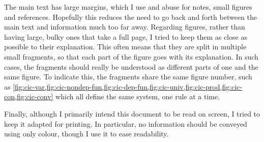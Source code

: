 The main text has large margins, which I use and abuse 
for notes, small figures and references. Hopefully this reduces the need to go
back and forth between the main text and information much too far away.
Regarding figures, rather than having large, bulky ones that take a full page,
I tried to keep them as close as possible to their explanation. This often means that
they are split in multiple small fragments, so that each part of the figure goes with its
explanation. In such cases, the fragments should really be understood
as different parts of one and the same figure. To indicate this, the fragments share the same
figure number, such as
\cref{fig:cic-var,fig:cic-nondep-fun,fig:cic-dep-fun,fig:cic-univ,fig:cic-prod,fig:cic-con,fig:cic-conv} which all define the same system, one rule at a time.

Finally, although I primarily intend this document to be read on screen, I tried to
keep it adapted for printing. In particular,
no information should be conveyed using only colour, though I use it to ease readability.

\cleardoubleevenemptypage


\begingroup %

\hypersetup{allcolors=.}

\setlength{\textheight}{230\vscale} %

\etocstandarddisplaystyle %
\etocstandardlines %
\setcounter{tocdepth}{\sectiontocdepth} %

\tableofcontents %

\setcounter{tocdepth}{\subsectiontocdepth} %




\endgroup
{}

